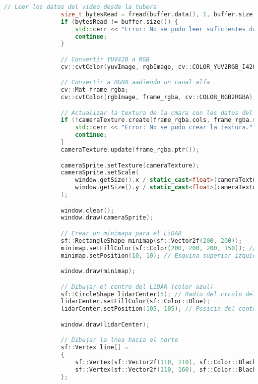 \begin{lstlisting}[language={C++}, caption={Primera versi\'on del c\'odigo del sistema de control del robot}, label={Script}]
                // Leer los datos del video desde la tubera
                size_t bytesRead = fread(buffer.data(), 1, buffer.size(), pipe);
                if (bytesRead != buffer.size()) {
                    std::cerr << "Error: No se pudo leer suficientes datos de video." << std::endl;
                    continue;
                }

                // Convertir YUV420 a RGB
                cv::cvtColor(yuvImage, rgbImage, cv::COLOR_YUV2RGB_I420);

                // Convertir a RGBA aadiendo un canal alfa
                cv::Mat frame_rgba;
                cv::cvtColor(rgbImage, frame_rgba, cv::COLOR_RGB2RGBA);

                // Actualizar la textura de la cmara con los datos del frame
                if (!cameraTexture.create(frame_rgba.cols, frame_rgba.rows)) {
                    std::cerr << "Error: No se pudo crear la textura." << std::endl;
                    continue;
                }
                cameraTexture.update(frame_rgba.ptr());

                cameraSprite.setTexture(cameraTexture);
                cameraSprite.setScale(
                    window.getSize().x / static_cast<float>(cameraTexture.getSize().x),
                    window.getSize().y / static_cast<float>(cameraTexture.getSize().y)
                );

                window.clear();
                window.draw(cameraSprite);

                // Crear un minimapa para el LiDAR
                sf::RectangleShape minimap(sf::Vector2f(200, 200));
                minimap.setFillColor(sf::Color(200, 200, 200, 150)); // Fondo semitransparente
                minimap.setPosition(10, 10); // Esquina superior izquierda

                window.draw(minimap);

                // Dibujar el centro del LiDAR (color azul)
                sf::CircleShape lidarCenter(5); // Radio del crculo del LiDAR
                lidarCenter.setFillColor(sf::Color::Blue);
                lidarCenter.setPosition(105, 105); // Posicin del centro en el minimapa

                window.draw(lidarCenter);

                // Dibujar la lnea hacia el norte
                sf::Vertex line[] =
                {
                    sf::Vertex(sf::Vector2f(110, 110), sf::Color::Black),
                    sf::Vertex(sf::Vector2f(110, 160), sf::Color::Black) // Lnea hacia arriba (norte)
                };


\end{lstlisting}
